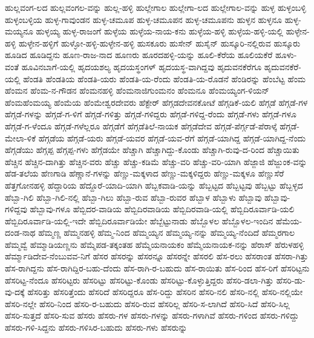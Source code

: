 {ಹುಲ್ಲವಂಗ-ಲದ
ಹುಲ್ಲವಂಗಲ-ವನ್ನು
ಹುಲ್ಲ-ಹಳ್ಳಿ
ಹುಲ್ಲೇಗಾಲ
ಹುಲ್ಲೇಗಾ-ಲದ
ಹುಲ್ಲೇಗಾಲ-ವನ್ನು
ಹುಳ್ಳ
ಹುಳ್ಳಂಬಳ್ಳಿ
ಹುಳ್ಳಂಬಳ್ಳಿಯ
ಹುಳ್ಳ-ಗಾವುಂಡನ
ಹುಳ್ಳ-ಚಮೂಪ
ಹುಳ್ಳ-ಚಮೂಪನ
ಹುಳ್ಳ-ಚಮೂಪನು
ಹುಳ್ಳನ
ಹುಳ್ಳನೂ
ಹುಳ್ಳ-ಮಯ್ಯನೂ
ಹುಳ್ಳಯ್ಯ
ಹುಳ್ಳ-ರಾಜಂಗೆ
ಹುಳ್ಳೆಯ
ಹುಳ್ಳೆಯ-ನಾಯ-ಕನು
ಹುಳ್ಳೆಯ-ಹಳ್ಳಿ
ಹುಳ್ಳೆಯ-ಹಳ್ಳಿ-ಯಲ್ಲಿ
ಹುಳ್ಳೇನ-ಹಳ್ಳಿ
ಹುಳ್ಳೇನ-ಹಳ್ಳಿಗೆ
ಹುಳ್ಳೋ-ಹಳ್ಳಿ-ಹುಳ್ಳೇನ-ಹಳ್ಳಿ
ಹುಸಕೂರು
ಹುಸೇನ್
ಹುಸೈನ್
ಹುಸ್ಕೂರಿ-ನಲ್ಲಿರುವ
ಹುಸ್ಕೂರು
ಹೂಡಿದ
ಹೂಡಿದ್ದನು
ಹೂಣ-ರಾಜ-ನಾದ
ಹೂಣರು
ಹೂರದಹಳ್ಳಿ-ಯನ್ನು
ಹೂಲಿ-ಕೆರೆಯ
ಹೂಲಿಯಕೆರೆ
ಹೂಳು-ವಂತೆ
ಹೂವಿನಬಾಗೆ-ಯಲ್ಲಿ
ಹೃದಯಶಲ್ಯ
ಹೃದಯಸ್ಥಂಗಳ್
ಹೃದಯಸ್ಥ-ವಾಗಿದ್ದವು
ಹೃದುವನಕೆರೆಗೂ
ಹೃದುವನಕೆರೆ-ಯಲ್ಲಿ
ಹೆಂಡತಿ
ಹೆಂಡತಿಯ
ಹೆಂಡತಿ-ಯರು
ಹೆಂಡತಿ-ಯ-ರೆಂದು
ಹೆಂಡತಿ-ಯ-ರೊಡನೆ
ಹೆಂಡಿರನ್ನು
ಹೆಂಬೆಟ್ಟ
ಹೆಂಮ
ಹೆಂಮನ
ಹೆಂಮ-ನ-ಗೌಡನ
ಹೆಂಮನಹಳ್ಳಿ
ಹೆಂಮನಾಜಿಗುಂಮನಂ
ಹೆಂಮನೂ
ಹೆಂಮಯ್ಯಂಗ-ಳಿಯನ್
ಹೆಂಮಹೆಂಮಯ್ಯ
ಹೆಂಮೆಯ
ಹೆಂಮೇಶ್ವರದೇವರು
ಹೆಕ್ಟೇರ್
ಹೆಗ್ಗಡದೇವನಕೋಟೆ
ಹೆಗ್ಗಡಿಕೆ-ಯಲಿ
ಹೆಗ್ಗಡೆ
ಹೆಗ್ಗಡೆ-ಗಳ
ಹೆಗ್ಗಡೆ-ಗಳನ್ನು
ಹೆಗ್ಗಡೆ-ಗ-ಳಿಗೆ
ಹೆಗ್ಗಡೆ-ಗಳಿತ್ತು
ಹೆಗ್ಗಡೆ-ಗಳಿದ್ದರು
ಹೆಗ್ಗಡೆ-ಗಳಿದ್ದ-ರೆಂದು
ಹೆಗ್ಗಡೆ-ಗಳು
ಹೆಗ್ಗಡೆ-ಗಳೂ
ಹೆಗ್ಗಡೆ-ಗ-ಳೆಂದೂ
ಹೆಗ್ಗಡೆ-ಗಳೆಲ್ಲರೂ
ಹೆಗ್ಗಡೆಗೆ
ಹೆಗ್ಗಡೆತಿಲೆ-ನಾಯಕ
ಹೆಗ್ಗಡೆದೇವ
ಹೆಗ್ಗಡೆ-ಪೆರ್ಗ್ಗಡೆ-ಪೆರಾಳ್ಕೆ
ಹೆಗ್ಗಡೆ-ಮೇಲಾ-ಳಿಕೆ
ಹೆಗ್ಗಡೆಯ
ಹೆಗ್ಗಡೆ-ಯರು
ಹೆಗ್ಗಡೆ-ಯವರ
ಹೆಗ್ಗಡೆ-ಯವ-ರೆಗೆ
ಹೆಗ್ಗಡೆ-ಯಾಗಿದ್ದ
ಹೆಗ್ಗಡೆ-ಯಾಗಿದ್ದ-ನೆಂದು
ಹೆಗ್ಗಡೆಯು
ಹೆಗ್ಗಪ್ಪ
ಹೆಗ್ಗಪ್ಪ-ಗಳು
ಹೆಗ್ಗೆಡಯೇ
ಹೆಚ್ಚಾಗಿ
ಹೆಚ್ಚಾಗಿದ್ದು-ಕೊಂಡು
ಹೆಚ್ಚಾಗಿ-ರುವು-ದ-ರಿಂದ
ಹೆಚ್ಚಾಯಿತು
ಹೆಚ್ಚಿನ
ಹೆಚ್ಚಿನ-ದಾಗಿತ್ತು
ಹೆಚ್ಚಿನ-ವರು
ಹೆಚ್ಚು
ಹೆಚ್ಚು-ಕಡಿಮೆ
ಹೆಚ್ಚು-ವರಿ
ಹೆಚ್ಚು-ವರಿ-ಯಾಗಿ
ಹೆಜ್ಜಾಜಿ
ಹೆಜ್ಜುಂಕ-ವನ್ನು
ಹೆಡ-ತಲೆಯ
ಹೆಣಗಾಡಿ
ಹೆಣ್ಣಾನೆ-ಗಳನ್ನು
ಹೆಣ್ಣು-ಮಕ್ಕಳಾದ
ಹೆಣ್ಣು-ಮಕ್ಕಳಿದ್ದರು
ಹೆಣ್ಣು-ಮಕ್ಕಳೂ
ಹೆಣ್ಣುಸೆರೆ
ಹೆತ್ತಗೋನಹಳ್ಳಿ
ಹೆದ್ದಾರಿಯ
ಹೆದ್ದೊರೆ-ಯಾದಿ-ಯಾಗಿ
ಹೆಬ್ಬಕವಾಡಿ-ಯನ್ನು
ಹೆಬ್ಬಟ್ಟದ
ಹೆಬ್ಬಟ್ಟವು
ಹೆಬ್ಬಟ್ಟು
ಹೆಬ್ಬಳ್ಳದ
ಹೆಬ್ಬಾ-ಗಿಲಿ
ಹೆಬ್ಬಾ-ಗಿಲಿ-ನಲ್ಲಿ
ಹೆಬ್ಬಾ-ಗಿಲು
ಹೆಬ್ಬಾ-ರುವ
ಹೆಬ್ಬಾ-ರುವರ
ಹೆಬ್ಬಾಳ
ಹೆಬ್ಬಾಳು
ಹೆಬ್ಬಾವು
ಹೆಬ್ಬಾವು-ಗಳಿದ್ದವು
ಹೆಬ್ಬಾವು-ಗಳೂ
ಹೆಬ್ಬಿದರ-ವಾಡಿಯ
ಹೆಬ್ಬಿದಿರವಾಡಿಯ
ಹೆಬ್ಬಿದಿರವಾಡಿ-ಯಲ್ಲಿ
ಹೆಬ್ಬಿದಿರೂರ್ವಾಡಿ-ಯಲಿ
ಹೆಬ್ಬಿದಿರೂರ್ವಾಡಿ-ಯಲ್ಲಿ-ಇದೇ
ಹೆಬ್ಬಿದಿರೂರ್ವಾಡಿಯೇ
ಹೆಬ್ಬೆಟ್ಟುನಾಡು
ಹೆಬ್ಬೊಳಲ
ಹೆಬ್ಬೊಳಲ-ಇಂದಿನ
ಹೆಮೆಯ-ದಂಡ-ನಾಥ
ಹೆಮ್ಮಣ್ಣ
ಹೆಮ್ಮನಹಳ್ಳಿ
ಹೆಮ್ಮ-ನಿಂದ
ಹೆಮ್ಮಯ್ಯನ
ಹೆಮ್ಮಯ್ಯ-ನನ್ನು
ಹೆಮ್ಮಯ್ಯ-ನೆಂದಿದೆ
ಹೆಮ್ಮರಗಾಲ
ಹೆಮ್ಮವ್ವೆ
ಹೆಮ್ಮಾಡಿಯಣ್ಣನು
ಹೆಮ್ಮೆಪಡ-ತಕ್ಕಂತಹ
ಹೆಮ್ಮೆಯನಾಯಕಂ
ಹೆಮ್ಮೆಯನಾಯಕ-ನನ್ನು
ಹೆರಾಸ್
ಹೆರುಳಹಳ್ಳಿ
ಹೆರ್ಮ್ಮಾಡಿದೇವ-ನೆಂಬುವವ-ನಿಗೆ
ಹೆಸರ
ಹೆಸರನ್ನು
ಹೆಸರನ್ನೂ
ಹೆಸರನ್ನೇ
ಹೆಸರಲಿ
ಹೆಸ-ರಲು
ಹೆಸರಾಂತ
ಹೆಸರಾ-ಗಿತ್ತು
ಹೆಸ-ರಾಗಿದ್ದನು
ಹೆಸ-ರಾಗಿದ್ದಿರ-ಬಹು-ದೆಂದು
ಹೆಸ-ರಾಗಿ-ರ-ಬಹುದು
ಹೆಸ-ರಾಯಿತು
ಹೆಸ-ರಿಂದ
ಹೆಸ-ರಿಗೆ
ಹೆಸರಿಟ್ಟನು
ಹೆಸರಿಟ್ಟ-ನೆಂದೂ
ಹೆಸರಿಟ್ಟರು
ಹೆಸರಿಟ್ಟು
ಹೆಸರಿಟ್ಟು-ಕೊಂಡು
ಹೆಸರಿಟ್ಟು-ಕೊಳ್ಳುತ್ತಿದ್ದರು
ಹೆಸರಿ-ಡಲಾ-ಗಿತ್ತು
ಹೆಸರಿ-ಡು-ವು-ದಕ್ಕೆ
ಹೆಸರಿತ್ತು
ಹೆಸರಿತ್ತೆಂದು
ಹೆಸರಿದೆ
ಹೆಸರಿದ್ದರೂ
ಹೆಸ-ರಿದ್ದು
ಹೆಸರಿನ
ಹೆಸರಿ-ನಲಿ
ಹೆಸರಿ-ನಲ್ಲಿ
ಹೆಸರಿ-ನಲ್ಲಿಯೇ
ಹೆಸರಿ-ನಲ್ಲೇ
ಹೆಸರಿ-ನಿಂದ
ಹೆಸರಿ-ರ-ಬಹುದು
ಹೆಸರಿ-ರುವ
ಹೆಸರಿಲ್ಲ
ಹೆಸರಿ-ಸ-ಲಾಗಿದೆ
ಹೆಸರಿ-ಸಿದೆ
ಹೆಸರಿ-ಸಿಲ್ಲ
ಹೆಸರಿ-ಸುತ್ತದೆ
ಹೆಸರಿ-ಸುವ
ಹೆಸರು
ಹೆಸರು-ಗಳ
ಹೆಸರು-ಗಳನ್ನು
ಹೆಸರು-ಗಳಾಗಿವೆ
ಹೆಸರು-ಗಳಿಂದ
ಹೆಸರು-ಗಳಿದ್ದು
ಹೆಸರು-ಗಳಿ-ಸಿದ್ದನು
ಹೆಸರು-ಗಳಿಸಿರ-ಬಹುದು
ಹೆಸರು-ಗಳು
ಹೆಸರುನ್ನು
}
